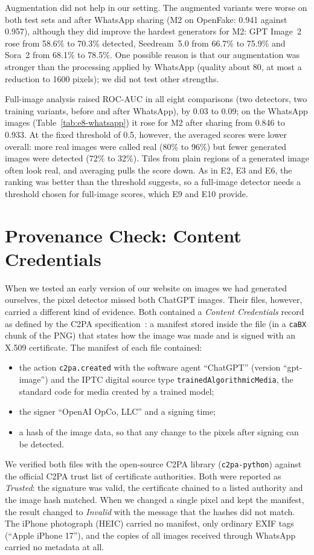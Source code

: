 \documentclass{mnnit}
\begin{document}
Augmentation did not help in our setting. The augmented variants were
worse on both test sets and after WhatsApp sharing (M2 on OpenFake:
0.941 against 0.957), although they did improve the hardest generators
for M2: GPT Image~2 rose from 58.6\% to 70.3\% detected, Seedream~5.0
from 66.7\% to 75.9\% and Sora~2 from 68.1\% to 78.5\%. One possible
reason is that our augmentation was stronger than the processing applied
by WhatsApp (quality about 80, at most a reduction to 1600 pixels); we
did not test other strengths.

Full-image analysis raised \mbox{ROC-AUC} in all eight comparisons (two
detectors, two training variants, before and after WhatsApp), by 0.03 to
0.09; on the WhatsApp images (Table~\ref{tab:e8-whatsapp}) it
rose for M2 after sharing from 0.846 to 0.933. At the fixed threshold of 0.5,
however, the averaged scores were lower overall: more real images were
called real (80\% to 96\%) but fewer generated images were detected
(72\% to 32\%). Tiles from plain regions of a generated image often look
real, and averaging pulls the score down. As in E2, E3 and E6, the
ranking was better than the threshold suggests, so a full-image detector
needs a threshold chosen for full-image scores, which E9 and E10
provide.

\section{Provenance Check: Content Credentials}
\label{sec:c2pa}
When we tested an early version of our website on images we had
generated ourselves, the pixel detector missed both ChatGPT images. Their
files, however, carried a different kind of evidence. Both contained a
\emph{Content Credentials} record as defined by the C2PA
specification~\cite{c2pa2025spec}: a manifest stored inside the file
(in a \texttt{caBX} chunk of the PNG) that states how the image was made
and is signed with an X.509 certificate. The manifest of each file
contained:
\begin{itemize}
  \item the action \texttt{c2pa.created} with the software agent
        ``ChatGPT'' (version ``\mbox{gpt-image}'') and the IPTC digital source
        type \texttt{trainedAlgorithmicMedia}, the standard code for media
        created by a trained model;
  \item the signer ``OpenAI OpCo, LLC'' and a signing time;
  \item a hash of the image data, so that any change to the pixels after
        signing can be detected.
\end{itemize}
We verified both files with the open-source C2PA library
(\texttt{c2pa-python}) against the official C2PA trust list of
certificate authorities. Both were reported as \emph{Trusted}: the
signature was valid, the certificate chained to a listed authority and
the image hash matched. When we changed a single pixel and kept the
manifest, the result changed to \emph{Invalid} with the message that the
hashes did not match. The iPhone photograph (HEIC) carried no manifest,
only ordinary EXIF tags (``Apple iPhone 17''), and the copies of all
images received through WhatsApp carried no metadata at all.
\end{document}
